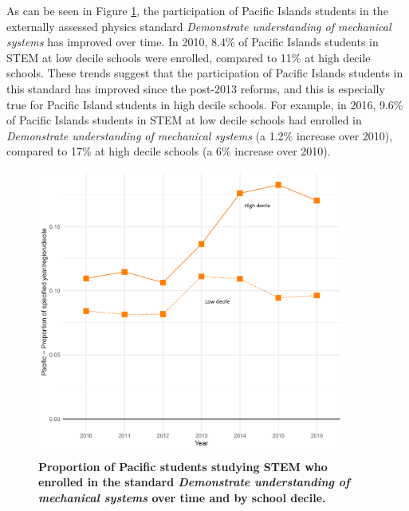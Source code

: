 \documentclass[a4paper]{article}
\begin{document}
As can be seen in Figure \ref{fig:PacificDecileMechanics}, the participation of Pacific Islands students in the externally assessed physics standard \textit{Demonstrate understanding of mechanical systems} has improved over time. In 2010, 8.4\% of Pacific Islands students in STEM at low decile schools were enrolled, compared to 11\% at high decile schools. These trends suggest that the participation of Pacific Islands students in this standard has improved since the post-2013 reforms, and this is especially true for Pacific Island students in high decile schools. For example, in 2016, 9.6\% of Pacific Islands students in STEM at low decile schools had enrolled in \textit{Demonstrate understanding of mechanical systems} (a 1.2\% increase over 2010), compared to 17\% at high decile schools (a 6\% increase over 2010). 

\begin{figure}[h]
    \centering
    \includegraphics[width=0.9\textwidth]{L3NCEA_PacificDecile_Mechanics.png}
    \caption{\textbf{Proportion of Pacific students studying STEM who enrolled in the standard \textit{Demonstrate understanding of mechanical systems} over time and by school decile. }
    }
    
    \label{fig:PacificDecileMechanics}
\end{figure}
\end{document}
